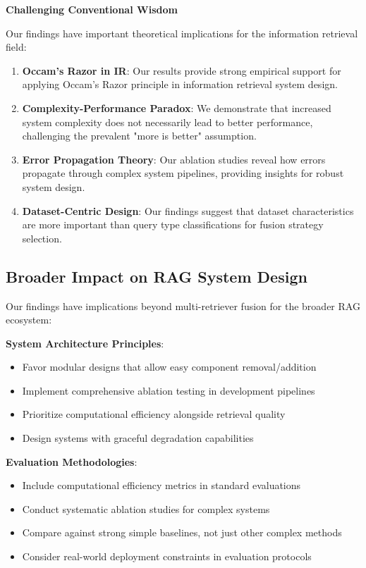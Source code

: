 \documentclass[letterpaper]{article} %
\begin{document}
\textbf{Challenging Conventional Wisdom}

Our findings have important theoretical implications for the information retrieval field:

\begin{enumerate}
\item \textbf{Occam's Razor in IR}: Our results provide strong empirical support for applying Occam's Razor principle in information retrieval system design.

\item \textbf{Complexity-Performance Paradox}: We demonstrate that increased system complexity does not necessarily lead to better performance, challenging the prevalent "more is better" assumption.

\item \textbf{Error Propagation Theory}: Our ablation studies reveal how errors propagate through complex system pipelines, providing insights for robust system design.

\item \textbf{Dataset-Centric Design}: Our findings suggest that dataset characteristics are more important than query type classifications for fusion strategy selection.
\end{enumerate}

\subsection{Broader Impact on RAG System Design}

Our findings have implications beyond multi-retriever fusion for the broader RAG ecosystem:

\textbf{System Architecture Principles}:
\begin{itemize}
\item Favor modular designs that allow easy component removal/addition
\item Implement comprehensive ablation testing in development pipelines
\item Prioritize computational efficiency alongside retrieval quality
\item Design systems with graceful degradation capabilities
\end{itemize}

\textbf{Evaluation Methodologies}:
\begin{itemize}
\item Include computational efficiency metrics in standard evaluations
\item Conduct systematic ablation studies for complex systems
\item Compare against strong simple baselines, not just other complex methods
\item Consider real-world deployment constraints in evaluation protocols
\end{itemize}
\end{document}
